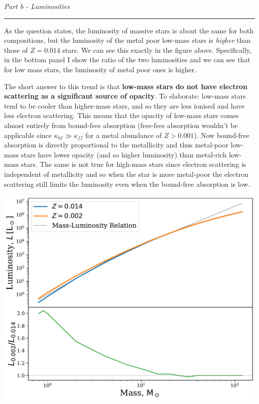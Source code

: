 \documentclass[12pt, letterpaper, twoside]{article}
\newcommand{\question}[1]{{\noindent \it #1}}
\newcommand{\answer}[1]{
    \par\noindent\rule{\textwidth}{0.4pt}#1\vspace{0.5cm}
}
\begin{document}
\question{Part b - Luminosities}
\answer{
    As the question states, the luminosity of massive stars is about the same for both compositions, but the luminosity of the metal poor low-mass stars is \textit{higher} than those of $Z = 0.014$ stars. We can see this exactly in the figure above. Specifically, in the bottom panel I show the ratio of the two luminosities and we can see that for low mass stars, the luminosity of metal poor ones is higher.

    The short answer to this trend is that \textbf{low-mass stars do not have electron scattering as a significant source of opacity}. To elaborate: low-mass stars tend to be cooler than higher-mass stars, and so they are less ionised and have less electron scattering. This means that the opacity of low-mass stars comes almost entirely from bound-free absorption (free-free absorption wouldn't be applicable since $\kappa_{bf} \gg \kappa_{ff}$ for a metal abundance of $Z > 0.001$). Now bound-free absorption is directly proportional to the metallicity and thus metal-poor low-mass stars have lower opacity (and so higher luminosity) than metal-rich low-mass stars. The same is not true for high-mass stars since electron scattering is independent of metallicity and so when the star is more metal-poor the electron scattering still limits the luminosity even when the bound-free absorption is low.
}

\begin{center}
    \includegraphics[width=\textwidth]{figures/ml_relation.pdf}
\end{center}
\end{document}
